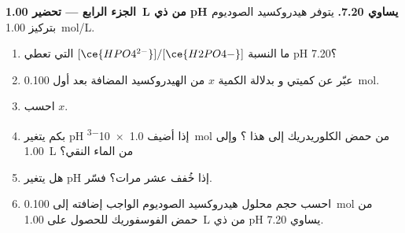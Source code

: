 \begin{problem}
\medskip
\noindent\textbf{الجزء الرابع --- تحضير \qty{1.00}{L} من  ذي pH يساوي 7.20.}
يتوفر هيدروكسيد الصوديوم بتركيز \qty{1.00}{mol/L}.
\begin{enumerate}[resume]
  \item ما النسبة $[\ce{HPO4^{2-}}]/[\ce{H2PO4-}]$ التي تعطي pH 7.20؟
  \item عبّر عن كميتي  و بدلالة
        الكمية $x$ من الهيدروكسيد المضافة بعد أول \qty{0.100}{mol}.
  \item احسب $x$.
  \item بكم يتغير pH إذا أضيف \qty{1.0e-3}{mol} من حمض
        الكلوريدريك إلى هذا ؟ وإلى \qty{1.00}{L} من الماء النقي؟
  \item هل يتغير pH إذا خُفف  عشر مرات؟ فسّر.
  \item احسب حجم محلول هيدروكسيد الصوديوم الواجب إضافته إلى
        \qty{0.100}{mol} من حمض الفوسفوريك للحصول على \qty{1.00}{L} من
         ذي pH يساوي 7.20.
\end{enumerate}
\end{problem}
